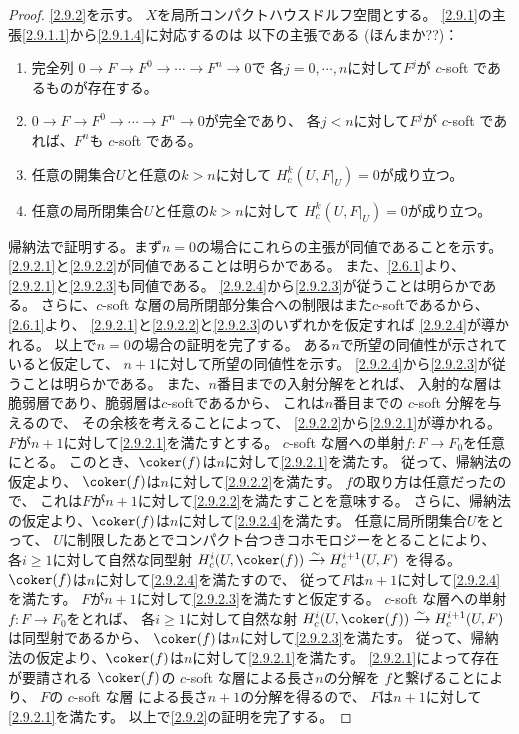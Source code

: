 \documentclass[uplatex,dvipdfmx]{jsarticle}
\begin{document}
\begin{proof}
  \ref{2.9.2}を示す。
  \(X\)を局所コンパクトハウスドルフ空間とする。
  \ref{2.9.1}の主張\ref{2.9.1.1}から\ref{2.9.1.4}に対応するのは
  以下の主張である (ほんまか??)：
  \begin{enumerate}
    \item \label{2.9.2.1}
    完全列
    \(0\to F\to F^0\to \cdots \to F^n\to 0\)で
    各\(j=0,\cdots,n\)に対して\(F^j\)が \(c\)-soft であるものが存在する。
    \item \label{2.9.2.2}
    \(0\to F\to F^0\to \cdots \to F^n\to 0\)が完全であり、
    各\(j<n\)に対して\(F^j\)が \(c\)-soft であれば、\(F^n\)も \(c\)-soft である。
    \item \label{2.9.2.3}
    任意の開集合\(U\)と任意の\(k>n\)に対して
    \(H^k_c(U,F|_U)=0\)が成り立つ。
    \item \label{2.9.2.4}
    任意の局所閉集合\(U\)と任意の\(k>n\)に対して
    \(H^k_c(U,F|_U)=0\)が成り立つ。
  \end{enumerate}
  帰納法で証明する。まず\(n=0\)の場合にこれらの主張が同値であることを示す。
  \ref{2.9.2.1}と\ref{2.9.2.2}が同値であることは明らかである。
  また、\autoref{2.6.1}より、
  \ref{2.9.2.1}と\ref{2.9.2.3}も同値である。
  \ref{2.9.2.4}から\ref{2.9.2.3}が従うことは明らかである。
  さらに、\(c\)-soft な層の局所閉部分集合への制限はまた\(c\)-softであるから、
  \autoref{2.6.1}より、
  \ref{2.9.2.1}と\ref{2.9.2.2}と\ref{2.9.2.3}のいずれかを仮定すれば
  \ref{2.9.2.4}が導かれる。
  以上で\(n=0\)の場合の証明を完了する。
  ある\(n\)で所望の同値性が示されていると仮定して、
  \(n+1\)に対して所望の同値性を示す。
  \ref{2.9.2.4}から\ref{2.9.2.3}が従うことは明らかである。
  また、\(n\)番目までの入射分解をとれば、
  入射的な層は脆弱層であり、脆弱層は\(c\)-softであるから、
  これは\(n\)番目までの \(c\)-soft 分解を与えるので、
  その余核を考えることによって、
  \ref{2.9.2.2}から\ref{2.9.2.1}が導かれる。
  \(F\)が\(n+1\)に対して\ref{2.9.2.1}を満たすとする。
  \(c\)-soft な層への単射\(f:F\to F_0\)を任意にとる。
  このとき、\(\coker(f)\)は\(n\)に対して\ref{2.9.2.1}を満たす。
  従って、帰納法の仮定より、
  \(\coker(f)\)は\(n\)に対して\ref{2.9.2.2}を満たす。
  \(f\)の取り方は任意だったので、
  これは\(F\)が\(n+1\)に対して\ref{2.9.2.2}を満たすことを意味する。
  さらに、帰納法の仮定より、\(\coker(f)\)は\(n\)に対して\ref{2.9.2.4}を満たす。
  任意に局所閉集合\(U\)をとって、
  \(U\)に制限したあとでコンパクト台つきコホモロジーをとることにより、
  各\(i\geq 1\)に対して自然な同型射
  \(H^i_c(U,\coker(f)) \xrightarrow{\sim} H^{i+1}_c(U,F)\)
  を得る。
  \(\coker(f)\)は\(n\)に対して\ref{2.9.2.4}を満たすので、
  従って\(F\)は\(n+1\)に対して\ref{2.9.2.4}を満たす。
  \(F\)が\(n+1\)に対して\ref{2.9.2.3}を満たすと仮定する。
  \(c\)-soft な層への単射\(f:F\to F_0\)をとれば、
  各\(i\geq 1\)に対して自然な射
  \(H^i_c(U,\coker(f)) \xrightarrow{\sim} H^{i+1}_c(U,F)\)
  は同型射であるから、
  \(\coker(f)\)は\(n\)に対して\ref{2.9.2.3}を満たす。
  従って、帰納法の仮定より、\(\coker(f)\)は\(n\)に対して\ref{2.9.2.1}を満たす。
  \ref{2.9.2.1}によって存在が要請される
  \(\coker(f)\)の \(c\)-soft な層による長さ\(n\)の分解を
  \(f\)と繋げることにより、
  \(F\)の \(c\)-soft な層 による長さ\(n+1\)の分解を得るので、
  \(F\)は\(n+1\)に対して\ref{2.9.2.1}を満たす。
  以上で\ref{2.9.2}の証明を完了する。


\end{proof}
\end{document}
